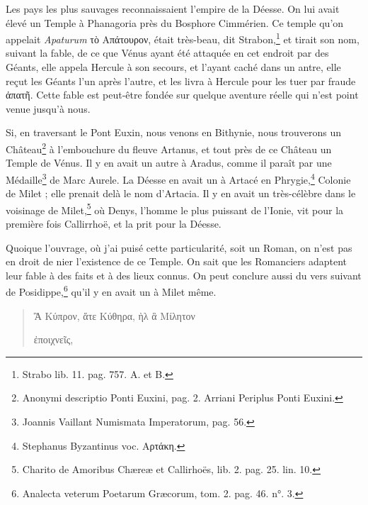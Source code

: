 \documentclass[a4paper, 11pt, oneside, polutonikogreek, french]{article}
\begin{document}
Les pays les plus sauvages reconnaissaient l'empire de la Déesse. On lui avait élevé un Temple à Phanagoria près du Bosphore Cimmérien. Ce temple qu'on appelait \emph{Apaturum} τὸ Απάτουρον, était très-beau, dit Strabon,\footnote{Strabo lib. 11. pag. 757. A. et B.} et tirait son nom, suivant la fable, de ce que Vénus ayant été attaquée en cet endroit par des Géants, elle appela Hercule à son secours, et l'ayant caché dans un antre, elle reçut les Géants l'un après l'autre, et les livra à Hercule pour les tuer par fraude ἀπατῆ. Cette fable est peut-être fondée sur quelque aventure réelle qui n'est point venue jusqu'à nous.

Si, en traversant le Pont Euxin, nous venons en Bithynie, nous trouverons un Château\footnote{Anonymi descriptio Ponti Euxini, pag. 2. Arriani Periplus Ponti Euxini.} à l'embouchure du fleuve Artanus, et tout près de ce Château un Temple de Vénus. Il y en avait un autre à Aradus, comme il paraît par une Médaille\footnote{Joannis Vaillant Numismata Imperatorum, pag. 56.} de Marc Aurele. La Déesse en avait un à Artacé en Phrygie,\footnote{Stephanus Byzantinus voc. Αρτάκη.} Colonie de Milet ; elle prenait delà le nom d'Artacia. Il y en avait un très-célèbre dans le voisinage de Milet,\footnote{Charito de Amoribus Chæreæ et Callirhoës, lib. 2. pag. 25. lin. 10.} où Denys, l'homme le plus puissant de l'Ionie, vit pour la première fois Callirrhoë, et la prit pour la Déesse.

Quoique l'ouvrage, où j'ai puisé cette particularité, soit un Roman, on n'est pas en droit de nier l'existence de ce Temple. On sait que les Romanciers adaptent leur fable à des faits et à des lieux connus. On peut conclure aussi du vers suivant de Posidippe,\footnote{Analecta veterum Poetarum Græcorum, tom. 2. pag. 46. n°. 3.} qu'il y en avait un à Milet même.
\begin{quotation}
Ἃ Κύπρον, ἅτε Κύθηρα, ὴλ ἃ Μίλητον

\hspace*{5mm}ἐποιχνεῖς,
\end{quotation}
\end{document}
